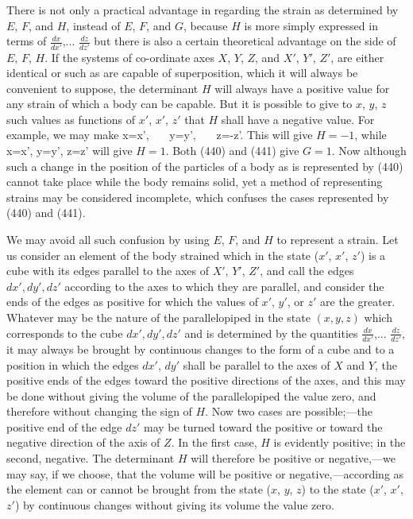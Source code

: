 \documentclass[12pt]{memoir}
\begin{document}
{There is not only a practical advantage in regarding the strain as determined by $E$, $F$, and $H$, instead of $E$, $F$, and $G$, because $H$ is more simply expressed in terms of $\frac{dx}{dx'}$,... $\frac{dz}{dz'}$ but there is also a certain theoretical advantage on the side of $E$, $F$, $H$. If the systems of co-ordinate axes $X$, $Y$, $Z$, and $X'$, $Y'$, $Z'$, are either identical or such as are capable of superposition, which it will always be convenient to suppose, the determinant $H$ will always have a positive value for any strain of which a body can be capable. But it is possible to give to $x$, $y$, $z$ such values as functions of $x'$, $x'$, $z'$ that $H$ shall have a negative value. For example, we may make
\eqs x=x', \ \ \ y=y', \ \ \ z=-z'.    \label{440}\eqe
This will give $H= -1$, while
\eqs x=x', y=y', z=z'     \label{441}\eqe
will give $H=1$. Both (440) and (441) give $G=1$. Now although such a change in the position of the particles of a body as is represented by (440) cannot take place while the body remains solid, yet a method of representing strains may be considered incomplete, which confuses the cases represented by (440) and (441).


We may avoid all such confusion by using $E$, $F$, and $H$ to represent a strain. Let us consider an element of the body strained which in the state ($x'$, $x'$, $z'$) is a cube with its edges parallel to the axes of $X'$, $Y'$, $Z'$, and call the edges $dx', dy', dz'$ according to the axes to which they are parallel, and consider the ends of the edges as positive for which the values of $x'$, $y'$, or $z'$ are the greater. Whatever may be the nature of the parallelopiped in the state $(x, y, z)$ which corresponds to the cube $dx', dy', dz'$ and is determined by the quantities $\frac{dx}{dx'}$,... $\frac{dz}{dz'}$, it may always be brought by continuous changes to the form of a cube and to a position in which the edges $dx'$, $dy'$ shall be parallel to the axes of $X$ and $Y$, the positive ends of the edges toward the positive directions of the axes, and this may be done without giving the volume of the parallelopiped the value zero, and therefore without changing the sign of $H$.  Now two cases are possible;---the positive end of the edge $dz'$ may be turned toward the positive or toward the negative direction of the axis of $Z$. In the first case, $H$ is evidently positive; in the second, negative. The determinant $H$ will therefore be positive or negative,---we may say, if we choose, that the volume will be positive or negative,---according as the element can or cannot be brought from the state ($x$, $y$, $z$) to the state ($x'$, $x'$, $z'$) by continuous changes without giving its volume the value zero.


}
\end{document}
